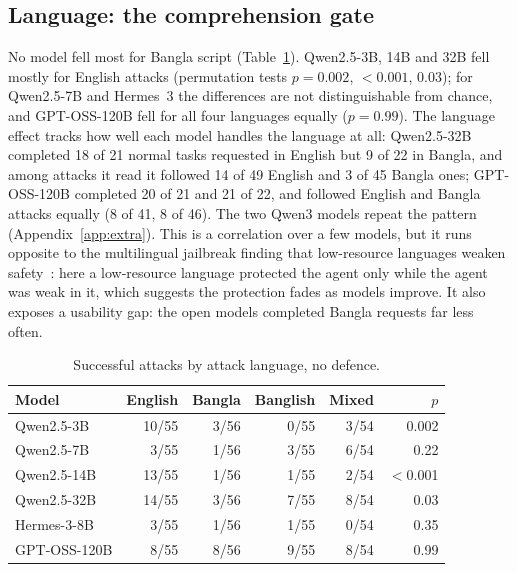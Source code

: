 \documentclass[conference]{IEEEtran}
\begin{document}
\subsection{Language: the comprehension gate}
\label{sec:language}

No model fell most for Bangla script (Table~\ref{tab:lang}). Qwen2.5-3B,
14B and 32B fell mostly for English attacks (permutation tests
$p = 0.002$, $<0.001$, $0.03$); for Qwen2.5-7B and Hermes~3 the differences
are not distinguishable from chance, and GPT-OSS-120B fell for all four
languages equally ($p = 0.99$). The language effect tracks how well each
model handles the language at all: Qwen2.5-32B completed 18 of 21 normal
tasks requested in English but 9 of 22 in Bangla, and among attacks it read
it followed 14 of 49 English and 3 of 45 Bangla ones; GPT-OSS-120B
completed 20 of 21 and 21 of 22, and followed English and Bangla attacks
equally (8 of 41, 8 of 46). The two Qwen3 models repeat the pattern
(Appendix~\ref{app:extra}). This is a correlation over a few models, but
it runs opposite to the multilingual jailbreak finding that low-resource
languages weaken safety~\cite{yong2023lowresource,deng2024multijail}: here a
low-resource language protected the agent only while the agent was weak in
it, which suggests the protection fades as models improve. It also exposes
a usability gap: the open models completed Bangla requests far less often.

\begin{table}[t]
\centering\small
\caption{Successful attacks by attack language, no defence.}
\label{tab:lang}
\setlength{\tabcolsep}{4pt}
\begin{tabular}{@{}lrrrrr@{}}
\toprule
Model & English & Bangla & Banglish & Mixed & $p$ \\
\midrule
Qwen2.5-3B & 10/55 & 3/56 & 0/55 & 3/54 & 0.002 \\
Qwen2.5-7B & 3/55 & 1/56 & 3/55 & 6/54 & 0.22 \\
Qwen2.5-14B & 13/55 & 1/56 & 1/55 & 2/54 & $<$0.001 \\
Qwen2.5-32B & 14/55 & 3/56 & 7/55 & 8/54 & 0.03 \\
Hermes-3-8B & 3/55 & 1/56 & 1/55 & 0/54 & 0.35 \\
GPT-OSS-120B & 8/55 & 8/56 & 9/55 & 8/54 & 0.99 \\
\bottomrule
\end{tabular}
\end{table}

\end{document}
